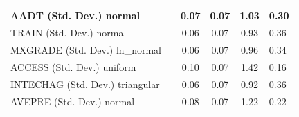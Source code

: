 \begin{table}
\begin{center}
\begin{tabular}{|l|l|c|c|c|l|}
			\hline
			AADT (Std. Dev.) normal &  & 0.07 & 0.07 & 1.03 & 0.30 \\
			\hline
			TRAIN (Std. Dev.) normal &  & 0.06 & 0.07 & 0.93 & 0.36 \\
			\hline
			MXGRADE (Std. Dev.) ln_normal &  & 0.06 & 0.07 & 0.96 & 0.34 \\
			\hline
			ACCESS (Std. Dev.) uniform &  & 0.10 & 0.07 & 1.42 & 0.16 \\
			\hline
			INTECHAG (Std. Dev.) triangular &  & 0.06 & 0.07 & 0.92 & 0.36 \\
			\hline
			AVEPRE (Std. Dev.) normal &  & 0.08 & 0.07 & 1.22 & 0.22 \\
			\hline
		\end{tabular}
	\end{center}
\end{table}